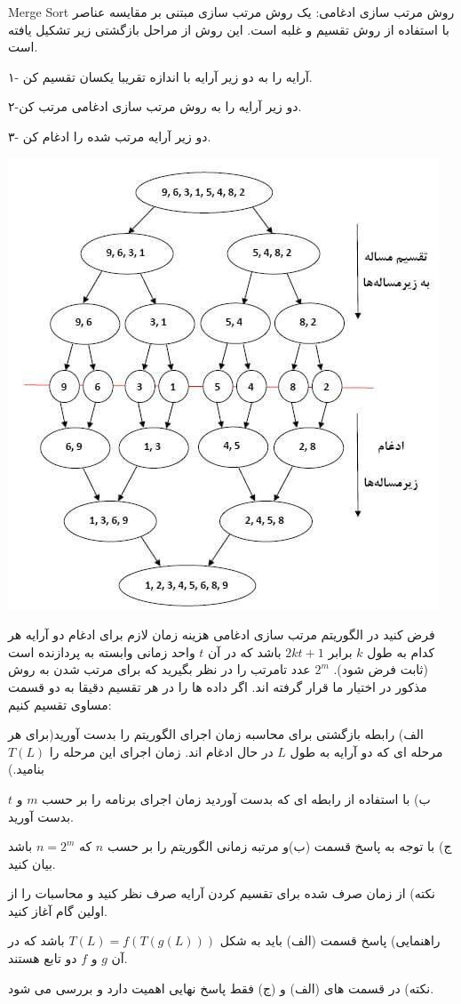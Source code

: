 \exercise
Merge Sort
روش مرتب سازی ادغامی: یک روش مرتب سازی مبتنی بر مقایسه عناصر با استفاده از روش تقسیم و غلبه است. این روش از مراحل بازگشتی زیر تشکیل یافته است.

۱- آرایه را به دو زیر آرایه با اندازه تقریبا یکسان تقسیم کن.

۲-دو زیر آرایه را به روش مرتب سازی ادغامی مرتب کن.

۳- دو زیر آرایه مرتب شده را ادغام کن.

    \begin{center}
     	\includegraphics[scale=0.5]{./3.png}
    \end{center}

فرض کنید در الگوریتم مرتب سازی ادغامی هزینه زمان لازم برای ادغام دو آرایه هر کدام به طول
$k$
برابر
$2kt + 1$
باشد که در آن
$t$
واحد زمانی وابسته به پردازنده است (ثابت فرض شود).
$2^m$
عدد تامرتب را در نظر بگیرید که برای مرتب شدن به روش مذکور در اختیار ما قرار گرفته اند. اگر داده ها را در هر تقسیم دقیقا به دو قسمت مساوی تقسیم کنیم:

الف) رابطه بازگشتی برای محاسبه زمان اجرای الگوریتم را بدست آورید‌(برای هر مرحله ای که دو آرایه به طول 
$L$
در حال ادغام اند. زمان اجرای این مرحله را
$T(L)$
بنامید.)

ب) با استفاده از رابطه ای که بدست آوردید زمان اجرای برنامه را بر حسب
$m$
و
$t$
بدست آورید.

ج) با توجه به پاسخ قسمت (ب)و مرتبه زمانی الگوریتم را بر حسب
$n$
که
$n = 2^m$
باشد بیان کنید.

نکته) از زمان صرف شده برای تقسیم کردن آرایه صرف نظر کنید و محاسبات را از اولین گام آغاز کنید.

راهنمایی) پاسخ قسمت (الف) باید به شکل
$T(L) = f(T(g(L)))$
باشد که در آن
$g$
و
$f$
دو تابع هستند.

نکته) در قسمت های (الف) و (ج) فقط پاسخ نهایی اهمیت دارد و بررسی می شود.